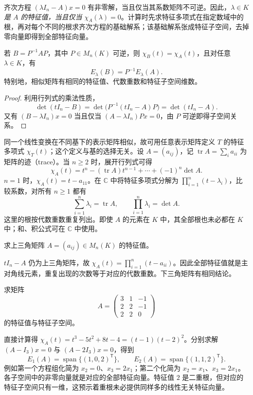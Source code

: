 齐次方程 $(\lambda I_n-A)x=0$ 有非零解，当且仅当其系数矩阵不可逆。因此，\emph{$\lambda\in K$ 是 $A$ 的特征值，当且仅当 $\chi_A(\lambda)=0$}。计算时先求特征多项式在指定数域中的根，再对每个不同的根求齐次方程的基础解系；该基础解系张成特征子空间，去掉零向量即得到全部特征向量。

\begin{theorem}[相似不变性]
\label{thm:xie-characteristic-similarity}
若 $B=P^{-1}AP$，其中 $P\in M_n(K)$ 可逆，则 $\chi_B(t)=\chi_A(t)$，且对任意 $\lambda\in K$，有
\[
 E_\lambda(B)=P^{-1}E_\lambda(A).
\]
特别地，相似矩阵有相同的特征值、代数重数和特征子空间维数。
\end{theorem}
\begin{proof}
利用行列式的乘法性质，
\[
 \det(tI_n-B)=\det\bigl(P^{-1}(tI_n-A)P\bigr)=\det(tI_n-A).
\]
又有 $(B-\lambda I_n)x=0$ 当且仅当 $(A-\lambda I_n)Px=0$，由 $P$ 可逆即得子空间关系。
\end{proof}

同一个线性变换在不同基下的表示矩阵相似，故可用任意表示矩阵定义 $T$ 的特征多项式 $\chi_T(t)$；这个定义与基的选择无关。设 $A=(a_{ij})$，记 $\operatorname{tr}A=\sum_i a_{ii}$ 为矩阵的迹（trace）。当 $n\geq2$ 时，展开行列式可得
\[
 \chi_A(t)=t^n-(\operatorname{tr}A)t^{n-1}+\cdots+(-1)^n\det A.
\]
$n=1$ 时，$\chi_A(t)=t-a_{11}$。在 $\mathbb C$ 中将特征多项式分解为 $\prod_{i=1}^n(t-\lambda_i)$，比较系数，对所有 $n\geq1$ 都有
\begin{equation}
\label{eq:xie-eigen-trace-det}
 \sum_{i=1}^n\lambda_i=\operatorname{tr}A,
 \qquad \prod_{i=1}^n\lambda_i=\det A.
\end{equation}
这里的根按代数重数重复列出。即使 $A$ 的元素在 $K$ 中，其全部根也未必都在 $K$ 中；和、积公式可在 $\mathbb C$ 中使用。

\begin{example}
\label{ex:xie-eigen-triangular}
求上三角矩阵 $A=(a_{ij})\in M_n(K)$ 的特征值。
\end{example}
\begin{solve}
$tI_n-A$ 仍为上三角矩阵，故 $\chi_A(t)=\prod_{i=1}^n(t-a_{ii})$。因此全部特征值就是主对角线元素，重复出现的次数等于对应的代数重数。下三角矩阵有相同结论。
\end{solve}

\begin{example}
\label{ex:xie-eigen-defective-three}
求矩阵
\[
 A=\begin{pmatrix}3&1&-1\\2&2&-1\\2&2&0\end{pmatrix}
\]
的特征值与特征子空间。
\end{example}
\begin{solve}
直接计算得 $\chi_A(t)=t^3-5t^2+8t-4=(t-1)(t-2)^2$。分别求解 $(A-I_3)x=0$ 与 $(A-2I_3)x=0$，得到
\[
 E_1(A)=\operatorname{span}\{(1,0,2)^{\mathsf T}\},
 \qquad E_2(A)=\operatorname{span}\{(1,1,2)^{\mathsf T}\}.
\]
例如第一个方程组化简为 $x_2=0$、$x_3=2x_1$；第二个化简为 $x_2=x_1$、$x_3=2x_1$。各子空间中的非零向量就是对应的全部特征向量。特征值 $2$ 是二重根，但对应的特征子空间只有一维，这预示着重根未必提供同样多的线性无关特征向量。
\end{solve}

